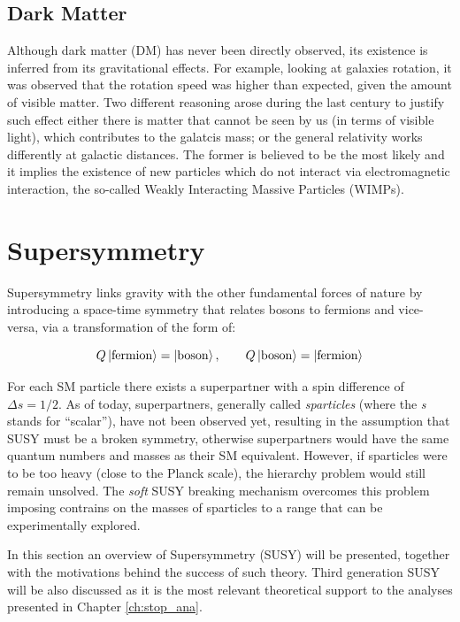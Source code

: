 		\subsection*{Dark Matter}

			Although dark matter (DM) has never been directly observed, its existence is inferred from its gravitational effects. For example, looking at galaxies rotation, it was observed that the rotation speed was higher than expected, given the amount of visible matter. Two different reasoning arose during the last century to justify such effect either there is matter that cannot be seen by us (in terms of visible light), which contributes to the galatcis mass; or the general relativity works differently at galactic distances. The former is believed to be the most likely and it implies the existence of new particles which do not interact via electromagnetic interaction, the so-called Weakly Interacting Massive Particles (WIMPs).





	\section{Supersymmetry}
	\label{sec:SUSY}

		Supersymmetry links gravity with the other fundamental forces of nature by introducing a space-time symmetry that relates bosons to fermions and vice-versa, via a transformation of the form of:  

		\begin{equation}
		\label{eq:susy_transformation}
			Q \ket{\mathrm{fermion}} = \ket{\mathrm{boson}}, \qquad Q \ket{\mathrm{boson}} = \ket{\mathrm{fermion}}
		\end{equation}

		\noindent For each SM particle there exists a superpartner with a spin difference of $\Delta s = 1/2$. As of today, superpartners, generally called \emph{sparticles} (where the \emph{s} stands for ``scalar''), have not been observed yet, resulting in the assumption that SUSY must be a broken symmetry, otherwise superpartners would have the same quantum numbers and masses as their SM equivalent. However, if sparticles were to be too heavy (close to the Planck scale), the hierarchy problem would still remain unsolved. The \emph{soft} SUSY breaking mechanism overcomes this problem imposing contrains on the masses of sparticles to a range that can be experimentally explored. 

		In this section an overview of Supersymmetry (SUSY) will be presented, together with the motivations behind the success of such theory. Third generation SUSY will be also discussed as it is the most relevant theoretical support to the analyses presented in Chapter \ref{ch:stop_ana}. 
		

